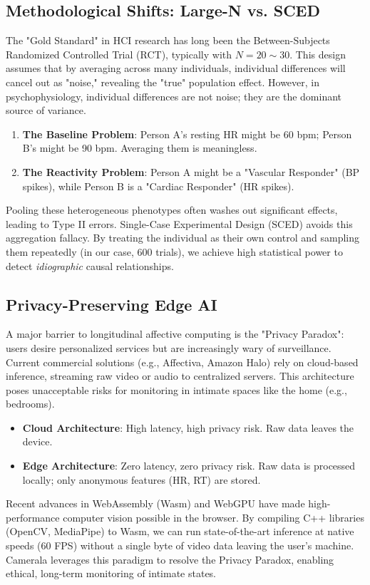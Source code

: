 \documentclass[journal]{IEEEtran}
\begin{document}
\subsection{Methodological Shifts: Large-N vs. SCED}
The "Gold Standard" in HCI research has long been the Between-Subjects Randomized Controlled Trial (RCT), typically with $N=20 \sim 30$.
This design assumes that by averaging across many individuals, individual differences will cancel out as "noise," revealing the "true" population effect.
However, in psychophysiology, individual differences are not noise; they are the dominant source of variance.
\begin{enumerate}
    \item \textbf{The Baseline Problem}: Person A's resting HR might be 60 bpm; Person B's might be 90 bpm. Averaging them is meaningless.
    \item \textbf{The Reactivity Problem}: Person A might be a "Vascular Responder" (BP spikes), while Person B is a "Cardiac Responder" (HR spikes).
\end{enumerate}
Pooling these heterogeneous phenotypes often washes out significant effects, leading to Type II errors.
Single-Case Experimental Design (SCED) \cite{barlow_sced} avoids this aggregation fallacy.
By treating the individual as their own control and sampling them repeatedly (in our case, 600 trials),
we achieve high statistical power to detect \textit{idiographic} causal relationships.

\subsection{Privacy-Preserving Edge AI}
A major barrier to longitudinal affective computing is the "Privacy Paradox": users desire personalized services but are increasingly wary of surveillance.
Current commercial solutions (e.g., Affectiva, Amazon Halo) rely on cloud-based inference, streaming raw video or audio to centralized servers.
This architecture poses unacceptable risks for monitoring in intimate spaces like the home (e.g., bedrooms).
\begin{itemize}
    \item \textbf{Cloud Architecture}: High latency, high privacy risk. Raw data leaves the device.
    \item \textbf{Edge Architecture}: Zero latency, zero privacy risk. Raw data is processed locally; only anonymous features (HR, RT) are stored.
\end{itemize}
Recent advances in WebAssembly (Wasm) and WebGPU have made high-performance computer vision possible in the browser.
By compiling C++ libraries (OpenCV, MediaPipe) to Wasm, we can run state-of-the-art inference at native speeds (60 FPS)
without a single byte of video data leaving the user's machine. Camerala leverages this paradigm to resolve the Privacy Paradox,
enabling ethical, long-term monitoring of intimate states.
\end{document}
